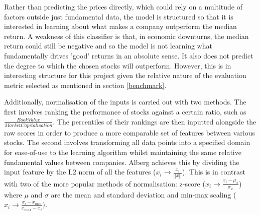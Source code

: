 \documentclass[10pt,onecolumn,letterpaper]{article}
\begin{document}
Rather than predicting the prices directly, which could rely on a multitude of factors outside just fundamental data, the model is structured so that it is interested in learning about what makes a company outperform the median return. A weakness of this classifier is that, in economic downturns, the median return could still be negative and so the model is not learning what fundamentally drives 'good' returns in an absolute sense. It also does not predict the degree to which the chosen stocks will outperform. However, this is in interesting structure for this project given the relative nature of the evaluation metric selected as mentioned in section \ref{benchmark}.

Additionally, normalisation of the inputs is carried out with two methods. The first involves ranking the performance of stocks against a certain ratio, such as $\frac{Book Value}{Market Capitalisation}$. The percentiles of their rankings are then inputted alongside the raw scores in order to produce a more comparable set of features between various stocks. The second involves transforming all data points into a specified domain for ease-of-use to the learning algorithm whilst maintaining the same relative fundamental values between companies. Alberg achieves this by dividing the input feature by the L2 norm of all the features ($x_{i} \rightarrow \frac{x_{i}}{||x||}$). This is in contrast with two of the more popular methods of normalisation: z-score ($x_{i} \rightarrow \frac{x_{i}-\mu_{x}}{\sigma_{x}}$) where $\mu$ and $\sigma$ are the mean and standard deviation and min-max scaling ($x_{i} \rightarrow \frac{x_{i}-x_{min}}{x_{max}-x_{i}})$.
\end{document}
